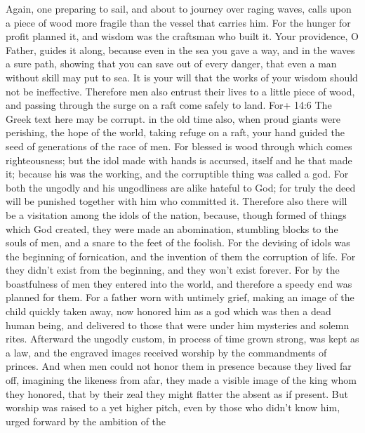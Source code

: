  Again, one preparing to sail, and about to journey over
raging waves, calls upon a piece of wood more fragile than the vessel
that carries him.  For the hunger for profit planned it, and
wisdom was the craftsman who built it.  Your providence, O
Father, guides it along, because even in the sea you gave a way, and in
the waves a sure path,  showing that you can save out of
every danger, that even a man without skill may put to sea. 
It is your will that the works of your wisdom should not be ineffective.
Therefore men also entrust their lives to a little piece of wood, and
passing through the surge on a raft come safely to land. 
For+ 14:6 The Greek text here may be corrupt. in the old time also, when
proud giants were perishing, the hope of the world, taking refuge on a
raft, your hand guided the seed of generations of the race of men.
 For blessed is wood through which comes righteousness;
 but the idol made with hands is accursed, itself and he
that made it; because his was the working, and the corruptible thing was
called a god.  For both the ungodly and his ungodliness are
alike hateful to God;  for truly the deed will be punished
together with him who committed it.  Therefore also there
will be a visitation among the idols of the nation, because, though
formed of things which God created, they were made an abomination,
stumbling blocks to the souls of men, and a snare to the feet of the
foolish.  For the devising of idols was the beginning of
fornication, and the invention of them the corruption of life.
 For they didn't exist from the beginning, and they won't
exist forever.  For by the boastfulness of men they entered
into the world, and therefore a speedy end was planned for them.
 For a father worn with untimely grief, making an image of
the child quickly taken away, now honored him as a god which was then a
dead human being, and delivered to those that were under him mysteries
and solemn rites.  Afterward the ungodly custom, in process
of time grown strong, was kept as a law, and the engraved images
received worship by the commandments of princes.  And when
men could not honor them in presence because they lived far off,
imagining the likeness from afar, they made a visible image of the king
whom they honored, that by their zeal they might flatter the absent as
if present.  But worship was raised to a yet higher pitch,
even by those who didn't know him, urged forward by the ambition of the
